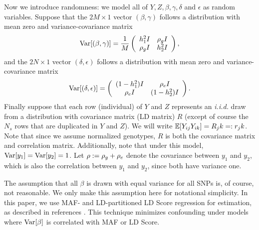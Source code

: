 \documentclass[11pt]{article}
\numberwithin{equation}{section}
\numberwithin{definition}{section}
\numberwithin{thm}{section}
\numberwithin{lemma}{section}
\numberwithin{prop}{section}
\numberwithin{cor}{section}
\numberwithin{hyp}{section}
\begin{document}
Now we introduce randomness:
we model all of $Y, Z, \beta, \gamma, \delta $ and $\epsilon$ as random variables.
Suppose that the $2M\times1$ vector $(\beta, \gamma)$ follows a distribution with mean zero and variance-covariance matrix\
\begin{equation*} 
	\mathrm{Var}[(\beta, \gamma)] = \frac{1}{M}
		\left( \begin{array}{cc}
		h_{1}^2 I & \rho_g I\\
		\rho_g I& h_{2}^2  I
	\end{array} \right),
\end{equation*}
and the $2N\times1$ vector $(\delta, \epsilon)$ follows a distribution with mean zero and variance-covariance matrix
\begin{equation*}
	\mathrm{Var}[(\delta, \epsilon)] = 
		\left( \begin{array}{cc}
		(1-h_{1}^2) I & \rho_e I\\
		\rho_e I& (1-h_{2}^2) I
	\end{array} \right).
\end{equation*}
Finally suppose that each row (individual) of $Y$ and $Z$ 
represents an \emph{i.i.d.} draw from a distribution with covariance matrix (LD matrix) $R$
(except of course the $N_s$ rows that are duplicated in $Y$ and $Z$).
We will write $\mathbb{E}[Y_{ij}Y_{ik}] = R_jk =: r_jk$. 
Note that since we assume normalized genotypes,
$R$ is both the covariance matrix and correlation matrix. 
Additionally, note that under this model, $\mathrm{Var}[y_1] = \mathrm{Var}[y_2] = 1$. 
Let $\rho := \rho_g + \rho_e$ denote the covariance between $y_1$ and $y_2$,
which is also the correlation between $y_1$ and $y_2$, since both have variance one.

The assumption that all $\beta$ is drawn with equal variance for all SNPs is, of course, not reasonable.
We only make this assumption here for notational simplicity. 
In this paper, we use MAF- and LD-partitioned LD Score regression for estimation, as described in references \cite{finucane2014partitioning,buliksullivan2014kernel}.
This technique minimizes confounding under models where $\mathrm{Var}[\beta]$ is correlated with MAF or LD Score.
\end{document}
